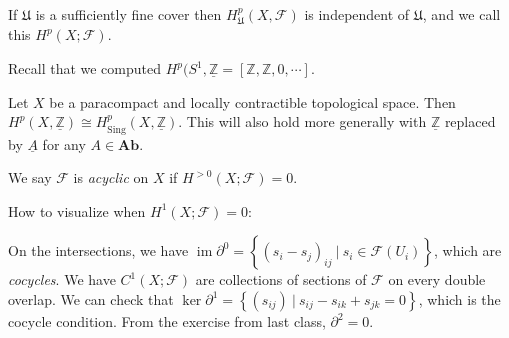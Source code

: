 \begin{fact}

If \(\mathfrak{U}\) is a sufficiently fine cover then
\(H^p_{\mathfrak{U}}(X, \mathcal{F})\) is independent of
\(\mathfrak{U}\), and we call this \(H^p(X; \mathcal{F})\).

\end{fact}

\begin{remark}

Recall that we computed
\(H^p(S^1, \underline{{\mathbb{Z}}} = [{\mathbb{Z}}, {\mathbb{Z}}, 0, \cdots]\).

\end{remark}

\begin{theorem}[?]

Let \(X\) be a paracompact and locally contractible topological space.
Then
\(H^p(X, \underline{{\mathbb{Z}}}) \cong H^p_{{\operatorname{Sing}}}(X, \underline{{\mathbb{Z}}})\).
This will also hold more generally with \(\underline{{\mathbb{Z}}}\)
replaced by \(\underline{A}\) for any \(A\in {\mathbf{Ab}}\).

\end{theorem}

\begin{definition}

We say \(\mathcal{F}\) is \emph{acyclic} on \(X\) if
\(H^{> 0 }(X; \mathcal{F}) = 0\).

\end{definition}

\begin{remark}

How to visualize when \(H^1(X; \mathcal{F}) = 0\):

\begin{figure}
\centering
{}
\end{figure}

On the intersections, we have
\(\operatorname{im}{{\partial}}^0 = \left\{{ (s_{i} - s_{j})_{ij} {~\mathrel{\Big|}~}s_i \in \mathcal{F}(U_i)}\right\}\),
which are \emph{cocycles}. We have \(C^1(X; \mathcal{F})\) are
collections of sections of \(\mathcal{F}\) on every double overlap. We
can check that
\(\ker {{\partial}}^1 = \left\{{ (s_{ij}) {~\mathrel{\Big|}~}s_{ij} - s_{ik} + s_{jk} = 0}\right\}\),
which is the cocycle condition. From the exercise from last class,
\({{\partial}}^2 = 0\).

\end{remark}

